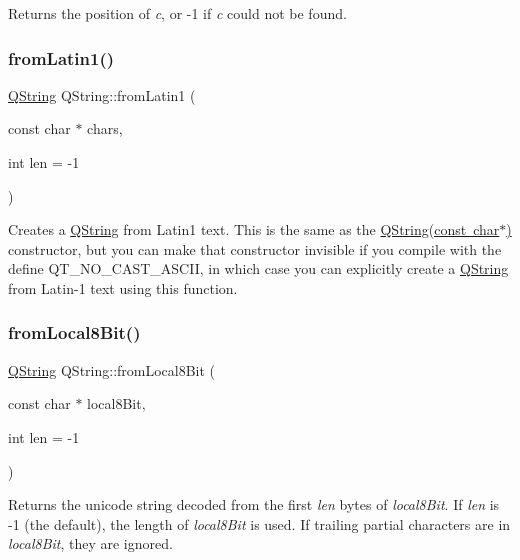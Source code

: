 Returns the position of {\itshape c}, or -\/1 if {\itshape c} could not be found. \mbox{\label{class_q_string_ab8e9aa9ff378aa3f3e531b26598712e3}} 
\subsubsection{\texorpdfstring{fromLatin1()}{fromLatin1()}}
{\footnotesize\ttfamily \mbox{\hyperlink{class_q_string}{Q\+String}} Q\+String\+::from\+Latin1 (\begin{DoxyParamCaption}\item[{const char $\ast$}]{chars,  }\item[{int}]{len = {\ttfamily -\/1} }\end{DoxyParamCaption})\hspace{0.3cm}{\ttfamily [static]}}

Creates a \mbox{\hyperlink{class_q_string}{Q\+String}} from Latin1 text. This is the same as the \mbox{\hyperlink{class_q_string_ac86c64fc0edc5d4c7347180dfa51e1d0}{Q\+String(const char$\ast$)}} constructor, but you can make that constructor invisible if you compile with the define Q\+T\+\_\+\+N\+O\+\_\+\+C\+A\+S\+T\+\_\+\+A\+S\+C\+II, in which case you can explicitly create a \mbox{\hyperlink{class_q_string}{Q\+String}} from Latin-\/1 text using this function. \mbox{\label{class_q_string_ad1175d375e2a8fee8e6411b855c63afb}} 
\subsubsection{\texorpdfstring{fromLocal8Bit()}{fromLocal8Bit()}}
{\footnotesize\ttfamily \mbox{\hyperlink{class_q_string}{Q\+String}} Q\+String\+::from\+Local8\+Bit (\begin{DoxyParamCaption}\item[{const char $\ast$}]{local8\+Bit,  }\item[{int}]{len = {\ttfamily -\/1} }\end{DoxyParamCaption})\hspace{0.3cm}{\ttfamily [static]}}

Returns the unicode string decoded from the first {\itshape len} bytes of {\itshape local8\+Bit}. If {\itshape len} is -\/1 (the default), the length of {\itshape local8\+Bit} is used. If trailing partial characters are in {\itshape local8\+Bit}, they are ignored.

